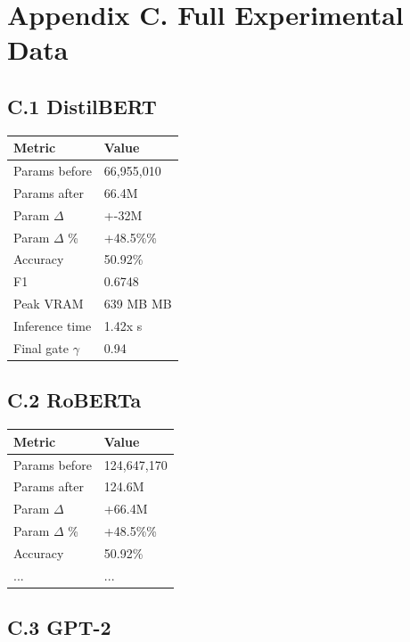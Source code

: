 
\section{Appendix C. Full Experimental Data}

\subsection{C.1 DistilBERT}

\begin{table}[H]
\centering
\small
\begin{tabular}{ll}
\toprule
\textbf{Metric} & \textbf{Value} \\
\midrule
Params before & 66,955,010 \\
Params after & 66.4M \\
Param $\Delta$ & +-32M \\
Param $\Delta$ \% & +48.5\%\% \\
Accuracy & 50.92\% \\
F1 & 0.6748 \\
Peak VRAM & 639 MB MB \\
Inference time & 1.42x s \\
Final gate $\gamma$ & 0.94 \\
\bottomrule
\end{tabular}
\end{table}

\subsection{C.2 RoBERTa}

\begin{table}[H]
\centering
\small
\begin{tabular}{ll}
\toprule
\textbf{Metric} & \textbf{Value} \\
\midrule
Params before & 124,647,170 \\
Params after & 124.6M \\
Param $\Delta$ & +66.4M \\
Param $\Delta$ \% & +48.5\%\% \\
Accuracy & 50.92\% \\
... & ... \\
\bottomrule
\end{tabular}
\end{table}

\subsection{C.3 GPT-2}


